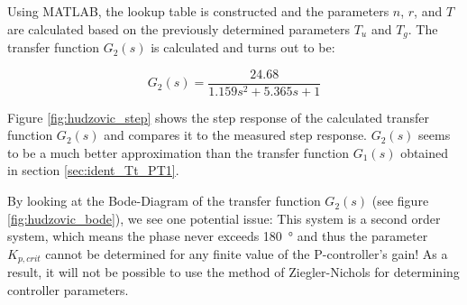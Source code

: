 Using MATLAB, the lookup table is constructed and the parameters $n$, $r$, and
$T$ are calculated based on  the  previously  determined  parameters $T_u$ and
$T_g$. The  transfer  function  $G_2(s)$  is  calculated  and turns out to be:

\begin{equation}
    G_2(s) = \frac{24.68}{1.159 s^2 + 5.365 s + 1}
\end{equation}

Figure  \ref{fig:hudzovic_step}  shows  the  step response of  the  calculated
transfer  function  $G_2(s)$  and  compares it to the measured step  response.
$G_2(s)$ seems to be a much better approximation  than  the  transfer function
$G_1(s)$ obtained in section \ref{sec:ident_Tt_PT1}.


By looking  at  the Bode-Diagram of the transfer function $G_2(s)$ (see figure
\ref{fig:hudzovic_bode}), we see one potential issue: This system  is a second
order system, which means  the  phase never exceeds \SI{180}{\degree} and thus
the parameter $K_{p,crit}$ cannot be  determined  for  any finite value of the
P-controller's gain! As a result, it will not be possible to use the method of
Ziegler-Nichols for determining controller parameters.

